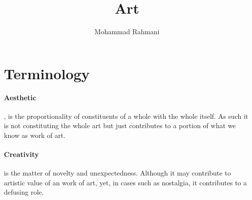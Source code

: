 \documentclass{article}
\begin{document}
	
	\title{Art}
	\author{Mohammad Rahmani}
	\date{}
	\maketitle
	\section{Terminology}
		\paragraph{Aesthetic}, is the proportionality of constituents of a whole with the whole itself. As such it is not constituting the whole art but just contributes to a portion of what we know as work of art.
		\paragraph{Creativity} is the matter of novelty and unexpectedness. Although it may contribute to artistic value of an work of art, yet, in cases such as nostalgia, it contributes to a defusing role.  
	
\end{document}
